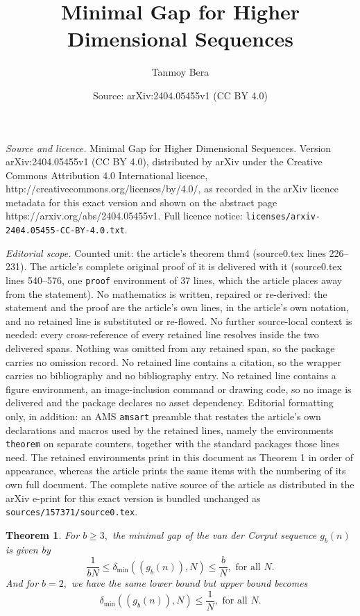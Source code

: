 \documentclass[10pt,a4paper]{amsart}
\title{Minimal Gap for Higher Dimensional Sequences}
\author{Tanmoy Bera}
\date{Source: arXiv:2404.05455v1 (CC BY 4.0)}
\newtheorem{theorem}{Theorem}
\begin{document}
\maketitle

\noindent\emph{Source and licence.} Minimal Gap for Higher Dimensional Sequences. Version arXiv:2404.05455v1 (CC BY 4.0), distributed by arXiv under the Creative Commons Attribution 4.0 International licence, http://creativecommons.org/licenses/by/4.0/, as recorded in the arXiv licence metadata for this exact version and shown on the abstract page https://arxiv.org/abs/2404.05455v1. Full licence notice: \texttt{licenses/arxiv-2404.05455-CC-BY-4.0.txt}.\par\smallskip

\noindent\textit{Editorial scope.} Counted unit: the article's theorem thm4 (source0.tex lines 226--231). The article's complete original proof of it is delivered with it (source0.tex lines 540--576, one \texttt{proof} environment of 37 lines, which the article places away from the statement). No mathematics is written, repaired or re-derived: the statement and the proof are the article's own lines, in the article's own notation, and no retained line is substituted or re-flowed.  No further source-local context is needed: every cross-reference of every retained line resolves inside the two delivered spans.  Nothing was omitted from any retained span, so the package carries no omission record.  No retained line contains a citation, so the wrapper carries no bibliography and no bibliography entry.  No retained line contains a figure environment, an image-inclusion command or drawing code, so no image is delivered and the package declares no asset dependency.  Editorial formatting only, in addition: an AMS \texttt{amsart} preamble that restates the article's own declarations and macros used by the retained lines, namely the environments \texttt{theorem} on separate counters, together with the standard packages those lines need.  The retained environments print in this document as Theorem 1 in order of appearance, whereas the article prints the same items with the numbering of its own full document.  The complete native source of the article as distributed in the arXiv e-print for this exact version is bundled unchanged as \texttt{sources/157371/source0.tex}.
	\begin{theorem}\label{thm4}
		For $b\geq 3,$ the minimal gap of the van der Corput sequence $g_b(n)$ is given by
		\[\frac{1}{bN}\leq\delta_{\text{min}}((g_b(n)),N)\leq \frac{b}{N},\text{ for all } N.\]
		And for $b=2,$ we have the same lower bound but upper bound becomes 
		\[\delta_{\text{min}}((g_b(n)),N)\leq \frac{1}{N},\text{ for all } N.\]
	\end{theorem}
\end{document}
